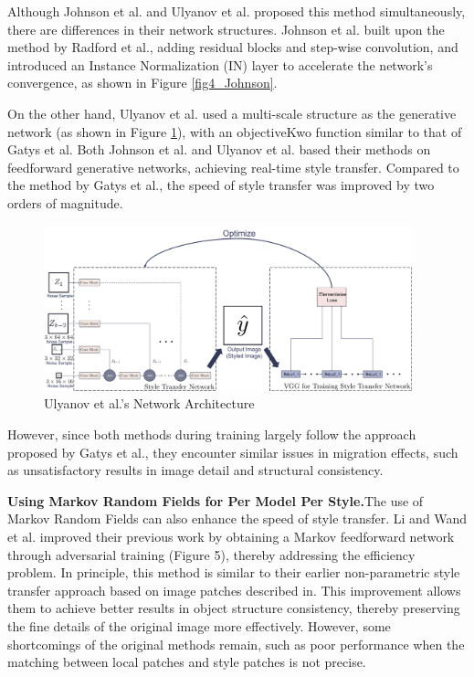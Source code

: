 Although Johnson et al. and Ulyanov et al. proposed this method simultaneously, there are differences in their network structures. Johnson\citep{22johnson2016perceptual} et al. built upon the method by Radford et al.\citep{34radford2015unsupervised}, adding residual blocks and step-wise convolution, and introduced an Instance Normalization (IN) layer to accelerate the network's convergence, as shown in Figure \ref{fig4_Johnson}.


On the other hand, Ulyanov et al.\citep{23ulyanov2016texture} used a multi-scale structure as the generative network (as shown in Figure \ref{fig5_Ulyanov}), with an objectiveKwo function similar to that of Gatys et al.\citep{02gatys2016image} Both Johnson et al. and Ulyanov et al. based their methods on feedforward generative networks, achieving real-time style transfer. Compared to the method by Gatys et al.\citep{02gatys2016image}, the speed of style transfer was improved by two orders of magnitude.

\begin{figure}[!htbp]%
    \centering%
    \includegraphics[width=0.95\textwidth]{fig/Figure_4_Ulyanov_et_al_'s_Network_Architecture_[23].pdf}
    \caption{Ulyanov et al.'s Network Architecture\citep{23ulyanov2016texture}}\label{fig5_Ulyanov}
\end{figure}

However, since both methods during training largely follow the approach proposed by Gatys et al., they encounter similar issues in migration effects, such as unsatisfactory results in image detail and structural consistency.

\textbf{Using Markov Random Fields for Per Model Per Style.}\quad The use of Markov Random Fields can also enhance the speed of style transfer. Li and Wand et al.\citep{35li2016precomputed} improved their previous work\citep{33li2016combining} by obtaining a Markov feedforward network through adversarial training (Figure 5), thereby addressing the efficiency problem. In principle, this method is similar to their earlier non-parametric style transfer approach based on image patches described in\citep{33li2016combining}. This improvement allows them to achieve better results in object structure consistency, thereby preserving the fine details of the original image more effectively. However, some shortcomings of the original methods remain, such as poor performance when the matching between local patches and style patches is not precise.

